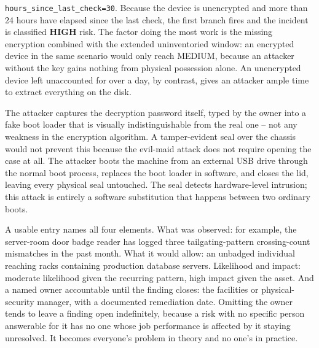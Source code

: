 \begin{answerkey}
\texttt{hours\_since\_last\_check=30}. Because the device is unencrypted and more than 24 hours have
elapsed since the last check, the first branch fires and the incident is classified \textbf{HIGH}
risk. The factor doing the most work is the missing encryption combined with the extended
uninventoried window: an encrypted device in the same scenario would only reach MEDIUM, because an
attacker without the key gains nothing from physical possession alone. An unencrypted device left
unaccounted for over a day, by contrast, gives an attacker ample time to extract everything on the
disk.
\item The attacker captures the decryption password itself, typed by the owner into a fake boot
loader that is visually indistinguishable from the real one -- not any weakness in the encryption
algorithm. A tamper-evident seal over the chassis would not prevent this because the evil-maid
attack does not require opening the case at all. The attacker boots the machine from an external
USB drive through the normal boot process, replaces the boot loader in software, and closes the
lid, leaving every physical seal untouched. The seal detects hardware-level intrusion; this attack
is entirely a software substitution that happens between two ordinary boots.
\item A usable entry names all four elements. What was observed: for example, the server-room
door badge reader has logged three tailgating-pattern crossing-count mismatches in the past
month. What it would allow: an unbadged individual reaching racks containing production database
servers. Likelihood and impact: moderate likelihood given the recurring pattern, high impact given
the asset. And a named owner accountable until the finding closes: the facilities or
physical-security manager, with a documented remediation date. Omitting the owner tends to leave a
finding open indefinitely, because a risk with no specific person answerable for it has no one
whose job performance is affected by it staying unresolved. It becomes everyone's problem in
theory and no one's in practice.
\end{answerkey}
